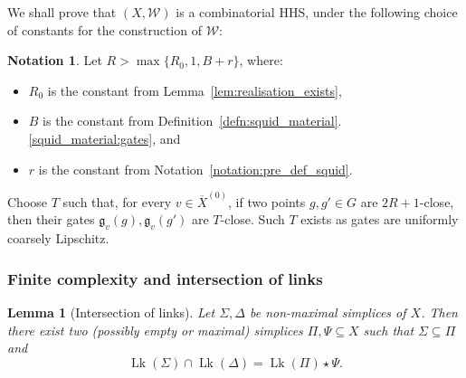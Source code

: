 \documentclass[svgnames]{amsart}
\theoremstyle{plain}
\newtheorem{lemma}[thm]{Lemma}
\theoremstyle{definition}
\newtheorem{notation}[thm]{Notation}
\newcommand{\ov}[1]{\overline{#1}}
\newcommand{\link}{\operatorname{Lk}}
\newcommand{\W}{\mathcal{W}}
\newcommand{\gate}{\mathfrak{g}}
\begin{document}
We shall prove that $(X,\W)$ is a combinatorial HHS, under the following choice of constants for the construction of $\W$:
\begin{notation}\label{notation:constants_squidification}
Let $R> \max\{R_0,1, B+r\}$, where:
\begin{itemize}
    \item $R_0$ is the constant from Lemma~\ref{lem:realisation_exists},
    \item $B$ is the constant from Definition~\ref{defn:squid_material}.\eqref{squid_material:gates}, and
    \item $r$ is the constant from Notation~\ref{notation:pre_def_squid}.
\end{itemize}
Choose $T$ such that, for every $v\in \ov{X}^{(0)}$, if two points $g,g'\in G$ are $2R+1$-close, then their gates $\gate_v(g), \gate_v(g')$ are $T$-close. Such $T$ exists as gates are uniformly coarsely Lipschitz. 
\end{notation}





\subsubsection{Finite complexity and intersection of links}\label{subsubsec:finite_complexity_and_int_link_squid}
\begin{lemma}[Intersection of links]\label{lem:intersection_links}
    Let $\Sigma,\Delta$ be non-maximal simplices of $X$. Then there exist two (possibly empty or maximal) simplices $\Pi,\Psi\subseteq X$ such that $\Sigma\subseteq \Pi$ and $$\link(\Sigma)\cap\link(\Delta)=\link(\Pi)\star\Psi.$$
\end{lemma}
\end{document}
